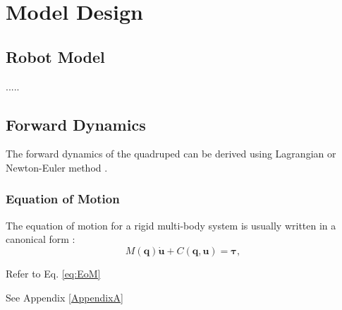 
\chapter{Model Design} %

\label{Chapter3} %


\section{Robot Model}
.....

\section{Forward Dynamics}

The forward dynamics of the quadruped can be derived using Lagrangian or Newton-Euler method \cite{greenwood1997classical}. 

\subsection{Equation of Motion}\label{EoMderive}
The equation of motion for a rigid multi-body system is usually written in a canonical form \cite{featherstone2014rigid}:
\begin{equation}\label{eq:EoM}
M(\mathbf{q})\mathbf{\dot{u}} + {C}(\mathbf{q,u}) =  \boldsymbol{\tau},
\end{equation}

Refer to Eq. \ref{eq:EoM}

See Appendix \ref{AppendixA}